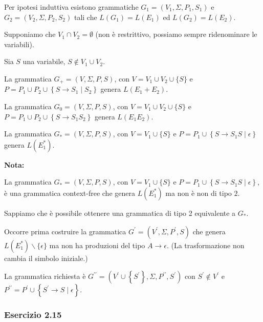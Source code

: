 Per ipotesi induttiva esistono grammatiche $G_{1}=\left(V_{1}, \Sigma, P_{1}, S_{1}\right)$ e $G_{2}=\left(V_{2}, \Sigma, P_{2}, S_{2}\right)$ tali che $L\left(G_{1}\right)=L\left(E_{1}\right)$ ed $L\left(G_{2}\right)=L\left(E_{2}\right)$.

Supponiamo che $V_{1} \cap V_{2}=\emptyset$ (non è restrittivo, possiamo sempre ridenominare le variabili).

\vspace{5mm}

Sia $S$ una variabile, $S \notin V_{1} \cup V_{2}$.

La grammatica $G_{+}=(V, \Sigma, P, S)$, con $V=V_{1} \cup V_{2} \cup\{S\}$ e
$P=P_{1} \cup P_{2} \cup\left\{S \rightarrow S_{1} \mid S_{2}\right\}$ genera $L\left(E_{1}+E_{2}\right)$.

La grammatica $G_{0}=(V, \Sigma, P, S)$, con $V=V_{1} \cup V_{2} \cup\{S\}$ e $P=P_{1} \cup P_{2} \cup\left\{S \rightarrow S_{1} S_{2}\right\}$ genera $L\left(E_{1} E_{2}\right)$.

La grammatica $G_{*}=(V, \Sigma, P, S)$, con $V=V_{1} \cup\{S\}$ e $P=P_{1} \cup\left\{S \rightarrow S_{1} S \mid \epsilon\right\}$ genera $L\left(E_{1}^{*}\right)$.

\vspace{5mm}

\textbf{Nota:}

La grammatica $G_{*}=(V, \Sigma, P, S)$, con $V=V_{1} \cup\{S\}$ e $P=P_{1} \cup\left\{S \rightarrow S_{1} S \mid \epsilon\right\}$, è una grammatica context-free che genera $L\left(E_{1}^{*}\right)$ ma non è non di tipo $2 .$

Sappiamo che è possibile ottenere una grammatica di tipo 2 equivalente a $G_{*}$.

Occorre prima costruire la grammatica $G^{\prime}=\left(V^{\prime}, \Sigma, P^{\prime}, S\right)$ che genera $L\left(E_{1}^{*}\right) \backslash\{\epsilon\}$ ma non ha produzioni del tipo $A \rightarrow \epsilon$. (La trasformazione non cambia il simbolo iniziale.)

La grammatica richiesta è $G^{\prime \prime}=\left(V^{\prime} \cup\left\{S^{\prime}\right\}, \Sigma, P^{\prime \prime}, S^{\prime}\right)$ con $S^{\prime} \notin V^{\prime}$ e $P^{\prime \prime}=P^{\prime} \cup\left\{S^{\prime} \rightarrow S \mid \epsilon\right\}$.

\subsubsection{Esercizio 2.15}

